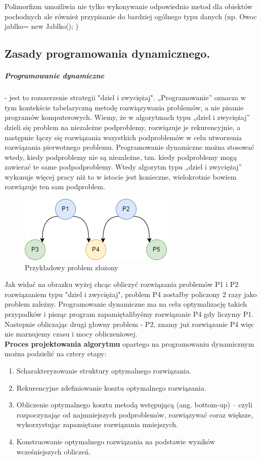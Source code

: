 \documentclass[a4paper,12pt,oneside]{book}
\begin{document}
				Polimorfizm umożliwia nie tylko wykonywanie odpowiednio metod dla obiektów pochodnych
				ale również przypisanie do bardziej ogólnego typu danych (np. Owoc jablko= new Jablko(); )
			\newpage\subsection{Zasady programowania dynamicznego.}
				\subparagraph{Programowanie dynamiczne} - jest to rozszerzenie strategii "dziel i zwyciężaj". „Programowanie” oznacza w tym
				kontekście tabelaryczną metodę rozwiązywania problemów, a nie pisanie programów komputerowych. Wiemy, że w algorytmach typu „dziel i zwyciężaj” dzieli się problem na niezależne podproblemy, rozwiązuje je rekurencyjnie, a następnie łączy się rozwiązania
				wszystkich podproblemów w celu utworzenia rozwiązania pierwotnego problemu. Programowanie dynamiczne można stosować wtedy, kiedy podproblemy nie są niezależne, tzn. kiedy podproblemy mogą zawierać te same podpodproblemy. Wtedy algorytm typu „dziel i zwyciężaj” wykonuje więcej pracy niż to w istocie jest konieczne, wielokrotnie
				bowiem rozwiązuje ten sam podproblem. \\
				
				\begin{figure}[h!]
					\centering\includegraphics[scale=0.45]{problem_dynam.png}
					\caption{Przykładowy problem złożony}
				\end{figure}
				
				Jak widać na obrazku wyżej chcąc obliczyć rozwiązania problemów P1 i P2 rozwiązaniem typu "dziel i zwyciężaj", problem P4 zostałby policzony 2 razy jako problem zależny. Programowanie dynamiczne ma na celu optymalizację takich przypadków i pisząc program zapamiętalibyśmy rozwiązanie P4 gdy liczymy P1. Nastepnie obliczając drugi głowny problem - P2, znamy już rozwiązanie P4 więc nie marnujemy czasu i mocy obliczeniowej.\\
				
				\textbf{Proces projektowania algorytmu} opartego na programowaniu dynamicznym można podzielić na cztery etapy: 
				\begin{enumerate}
					\item Scharakteryzowanie struktury optymalnego rozwiązania. 
					\item Rekurencyjne zdefiniowanie kosztu optymalnego rozwiązania.
					\item Obliczenie optymalnego kosztu metodą wstępującą (ang. bottom-up) – czyli rozpoczynając od najmniejszych podproblemów, rozwiązywać coraz większe, wykorzystując zapamiętane rozwiązania mniejszych.
					\item Konstruowanie optymalnego rozwiązania na podstawie wyników wcześniejszych obliczeń. 
				\end{enumerate}
				
\end{document}
